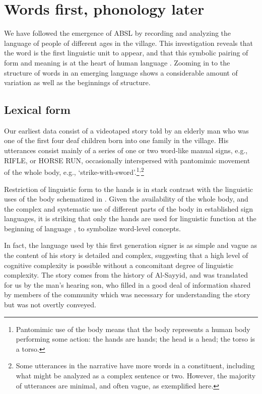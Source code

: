 \documentclass[output=paper]{langsci/langscibook}
\begin{document}
\section{Words first, phonology later}

We have followed the emergence of ABSL by recording and analyzing the language of people of different ages in the village.  This investigation reveals that the word is the first linguistic unit to appear, and that this symbolic pairing of form and meaning is at the heart of human language \citep{Sandler2013}.  Zooming in to the structure of words in an emerging language shows a considerable amount of variation as well as the beginnings of structure.  

\subsection{Lexical form}

Our earliest data consist of a videotaped story told by an elderly man who was one of the first four deaf children born into one family in the village.  His utterances consist mainly of a series of one or two word-like manual signs, e.g., RIFLE, or HORSE RUN, occasionally interspersed with pantomimic movement of the whole body, e.g., ‘strike-with-sword’.\footnote{Pantomimic use of the body means that the body represents a human body performing some action: the hands are hands; the head is a head; the torso is a torso.  }\textsuperscript{,}\footnote{Some utterances in the narrative have more words in a constituent, including what might be analyzed as a complex sentence or two.  However, the majority of utterances are minimal, and often vague, as exemplified here.} 

 Restriction of linguistic form to the hands is in stark contrast with the linguistic uses of the body schematized in .  Given the availability of the whole body, and the complex and systematic use of different parts of the body in established sign languages, it is striking that only the hands are used for linguistic function at the beginning of language \citep{Sandler2012a}, to symbolize word-level concepts.  

 In fact, the language used by this first generation signer is as simple and vague as the content of his story is detailed and complex, suggesting that a high level of cognitive complexity is possible without a concomitant degree of linguistic complexity.  The story comes from the history of Al-Sayyid, and was translated for us by the man’s hearing son, who filled in a good deal of information shared by members of the community which was necessary for understanding the story but was not overtly conveyed.   
\end{document}
